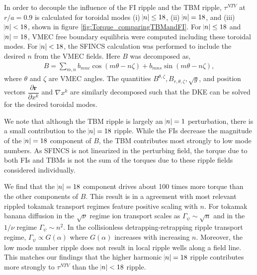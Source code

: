\documentclass[aip, pop, preprint]{revtex4-1}
\numberwithin{figure}{section}
\numberwithin{equation}{section}
\newcommand{\partder}[2]{\dfrac{\partial  #1}{\partial  #2}} %
\begin{document}
In order to decouple the influence of the FI ripple and the TBM ripple, $\tau^{NTV}$ at $r/a = 0.9$ is calculated for toroidal modes (i) $\abs{n} \leq 18$, (ii) $\abs{n} = 18$, and (iii) $\abs{n} < 18$, shown in figure \ref{fig:Torque_comparingTBMandFI}. For $\abs{n} \leq 18$ and $\abs{n} = 18$, VMEC free boundary equilibria were computed including these toroidal modes. For $\abs{n} < 18$, the SFINCS calculation was performed to include the desired $n$ from the VMEC fields. Here $B$ was decomposed as,
\begin{gather}
B = \sum_{m,n} b_{mnc} \cos(m\theta-n\zeta) + b_{mns} \sin(m\theta-n\zeta),
\end{gather}
where $\theta$ and $\zeta$ are VMEC angles. The quantities $B^{\theta,\zeta}, B_{r,\theta,\zeta}, \sqrt{g}$, and position vectors $\partder{\bm{r}}{x^k}$ and $\nabla x^k$ are similarly decomposed such that the DKE can be solved for the desired toroidal modes.

We note that although the TBM ripple is largely an $\abs{n} = 1$ perturbation, there is a small contribution to the $\abs{n} = 18$ ripple. While the FIs decrease the magnitude of the $\abs{n} =18$ component of $B$, the TBM contributes most strongly to low mode numbers. As SFINCS is not linearized in the perturbing field, the torque due to both FIs and TBMs is not the sum of the torques due to these ripple fields considered individually. 

We find that the $\abs{n} = 18$ component drives about 100 times more torque than the other components of $B$. This result is in a agreement with most relevant rippled tokamak transport regimes feature positive scaling with $n$. For tokamak banana diffusion in the $\sqrt{\nu}$ regime\cite{Shaing2008} ion transport scales as $\Gamma_{\psi} \sim \sqrt{n}$ and in the $1/\nu$ regime\cite{Shaing2003} $\Gamma_{\psi} \sim n^2$.  In the collisionless detrapping-retrapping ripple transport regime,\cite{Shaing1982a,Shaing1982b} $\Gamma_{\psi} \propto G(\alpha)$ where $G(\alpha)$ increases with increasing $n$. Moreover, the low mode number ripple does not result in local ripple wells along a field line. This matches our findings that the higher harmonic $\abs{n} = 18$ ripple contributes more strongly to $\tau^{NTV}$ than the $\abs{n} < 18$ ripple. 
\end{document}
